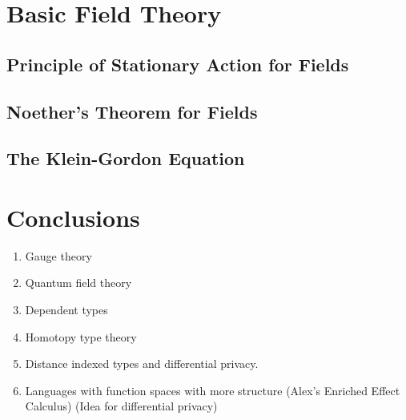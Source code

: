 \documentclass[preprint]{sigplanconf}
\theoremstyle{examplestyle}
\begin{document}
\section{Basic Field Theory}

\subsection{Principle of Stationary Action for Fields}

\subsection{Noether's Theorem for Fields}

\subsection{The Klein-Gordon Equation}

\section{Conclusions}

\begin{enumerate}
\item Gauge theory
\item Quantum field theory
\item Dependent types
\item Homotopy type theory
\item Distance indexed types and differential privacy.
\item Languages with function spaces with more structure (Alex's
  Enriched Effect Calculus) (Idea for differential privacy)
\end{enumerate}


\newpage
\end{document}
